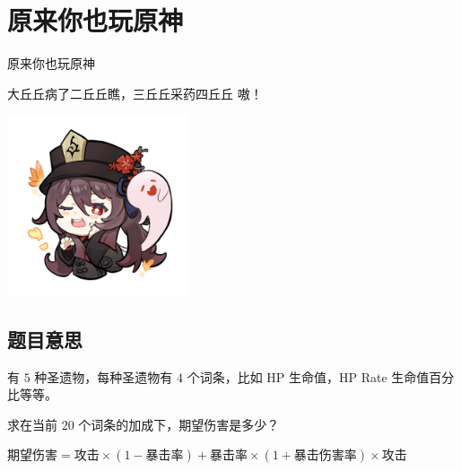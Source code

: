 \def\sectionName{原来你也玩原神}
\section[\TOCName]{\sectionName}



\begin{frame}

\isBeamerMode\relax
    {\Huge \sectionName}\par
\fi




大丘丘病了二丘丘瞧，三丘丘采药四丘丘 嗷！

\begin{center}
\includegraphics[width=0.4\textwidth]{./pic/hutao.png}
\end{center}


\end{frame}

\subsection{题目意思}
\begin{frame} %
有 $5$ 种圣遗物，每种圣遗物有 $4$ 个词条，比如 HP 生命值，HP Rate 生命值百分比等等。

求在当前 $20$ 个词条的加成下，期望伤害是多少？

$\text{期望伤害} = \text{攻击}\times (1 - \text{暴击率}) + \text{暴击率}\times (1 + \text{暴击伤害率})\times \text{攻击}$
\end{frame}



